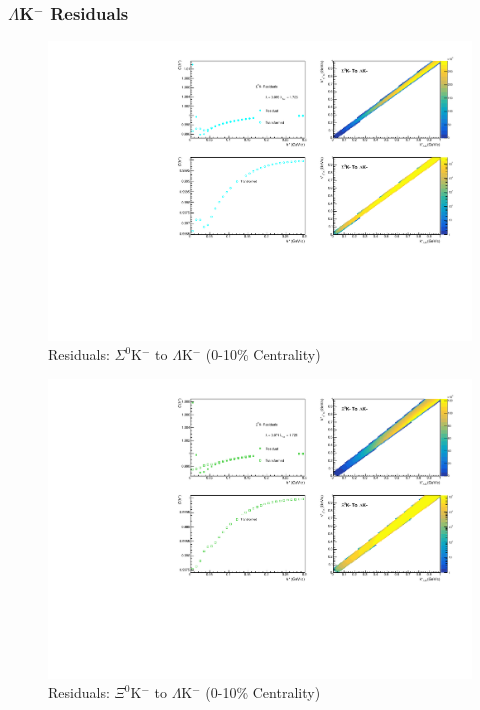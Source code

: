 \documentclass[../AnalysisNoteJBuxton.tex]{subfiles}
\begin{document}
\subsubsection{\texorpdfstring{$\Lambda$K$^{-}$}{TEXT} Residuals}
\label{Residuals_LamKchM}

\begin{figure}[h]
  \centering
  \includegraphics[width=\textwidth]{9_AdditionalFigures/Figures/Residuals/LamKchM/Residuals_LamKchM_0010_Sig0KchM_MomResCrctn_NonFlatBgdCrctn_10Res_PrimMaxDecay4fm_UsingXiDataAndCoulombOnly.pdf}
  \caption[Residuals: $\Sigma^{0}$K$^{-}$ to $\Lambda$K$^{-}$ (0-10\% Centrality)]{Residuals: $\Sigma^{0}$K$^{-}$ to $\Lambda$K$^{-}$ (0-10\% Centrality)}
  \label{fig:Res_LamKchM_0010_Sig0KchM}
\end{figure}


\begin{figure}[h]
  \centering
  \includegraphics[width=\textwidth]{9_AdditionalFigures/Figures/Residuals/LamKchM/Residuals_LamKchM_0010_Xi0KchM_MomResCrctn_NonFlatBgdCrctn_10Res_PrimMaxDecay4fm_UsingXiDataAndCoulombOnly.pdf}
  \caption[Residuals: $\Xi^{0}$K$^{-}$ to $\Lambda$K$^{-}$ (0-10\% Centrality)]{Residuals: $\Xi^{0}$K$^{-}$ to $\Lambda$K$^{-}$ (0-10\% Centrality)}
  \label{fig:Res_LamKchM_0010_Xi0KchM}
\end{figure}
\end{document}
